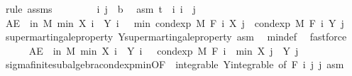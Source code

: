 \begin{isabellebody}
\ {\isacharparenleft}{\kern0pt}rule\ assms{\isacharparenright}{\kern0pt}\isanewline
\ \ \isacommand{{\isacharbraceleft}{\kern0pt}}\isamarkupfalse%
\isanewline
\ \ \ \ \isamarkupfalse%
\ i\ j\ {\isacharcolon}{\kern0pt}{\isacharcolon}{\kern0pt}\ {\isacharprime}{\kern0pt}b\ \isamarkupfalse%
\ asm{\isacharcolon}{\kern0pt}\ {\isachardoublequoteopen}t\ {\isasymle}\ i{\isachardoublequoteclose}\ {\isachardoublequoteopen}i\ {\isasymle}\ j{\isachardoublequoteclose}\isanewline
\ \ \ \ \isamarkupfalse%
\ {\isachardoublequoteopen}AE\ {\isasymxi}\ in\ M{\isachardot}{\kern0pt}\ min\ {\isacharparenleft}{\kern0pt}X\ i\ {\isasymxi}{\isacharparenright}{\kern0pt}\ {\isacharparenleft}{\kern0pt}Y\ i\ {\isasymxi}{\isacharparenright}{\kern0pt}\ {\isasymge}\ min\ {\isacharparenleft}{\kern0pt}cond{\isacharunderscore}{\kern0pt}exp\ M\ {\isacharparenleft}{\kern0pt}F\ i{\isacharparenright}{\kern0pt}\ {\isacharparenleft}{\kern0pt}X\ j{\isacharparenright}{\kern0pt}\ {\isasymxi}{\isacharparenright}{\kern0pt}\ {\isacharparenleft}{\kern0pt}cond{\isacharunderscore}{\kern0pt}exp\ M\ {\isacharparenleft}{\kern0pt}F\ i{\isacharparenright}{\kern0pt}\ {\isacharparenleft}{\kern0pt}Y\ j{\isacharparenright}{\kern0pt}\ {\isasymxi}{\isacharparenright}{\kern0pt}{\isachardoublequoteclose}\ \isamarkupfalse%
\ supermartingale{\isacharunderscore}{\kern0pt}property\ Y{\isachardot}{\kern0pt}supermartingale{\isacharunderscore}{\kern0pt}property\ asm\ \isamarkupfalse%
\ min{\isacharunderscore}{\kern0pt}def\ \isamarkupfalse%
\ fastforce\isanewline
\ \ \ \ \isamarkupfalse%
\ {\isachardoublequoteopen}AE\ {\isasymxi}\ in\ M{\isachardot}{\kern0pt}\ min\ {\isacharparenleft}{\kern0pt}X\ i\ {\isasymxi}{\isacharparenright}{\kern0pt}\ {\isacharparenleft}{\kern0pt}Y\ i\ {\isasymxi}{\isacharparenright}{\kern0pt}\ {\isasymge}\ cond{\isacharunderscore}{\kern0pt}exp\ M\ {\isacharparenleft}{\kern0pt}F\ i{\isacharparenright}{\kern0pt}\ {\isacharparenleft}{\kern0pt}{\isasymlambda}{\isasymxi}{\isachardot}{\kern0pt}\ min\ {\isacharparenleft}{\kern0pt}X\ j\ {\isasymxi}{\isacharparenright}{\kern0pt}\ {\isacharparenleft}{\kern0pt}Y\ j\ {\isasymxi}{\isacharparenright}{\kern0pt}{\isacharparenright}{\kern0pt}\ {\isasymxi}{\isachardoublequoteclose}\ \isamarkupfalse%
\ sigma{\isacharunderscore}{\kern0pt}finite{\isacharunderscore}{\kern0pt}subalgebra{\isachardot}{\kern0pt}cond{\isacharunderscore}{\kern0pt}exp{\isacharunderscore}{\kern0pt}min{\isacharbrackleft}{\kern0pt}OF\ {\isacharunderscore}{\kern0pt}\ integrable\ Y{\isachardot}{\kern0pt}integrable{\isacharcomma}{\kern0pt}\ of\ {\isachardoublequoteopen}F\ i{\isachardoublequoteclose}\ j\ j{\isacharbrackright}{\kern0pt}\ asm\ \isamarkupfalse%

\end{isabellebody}
